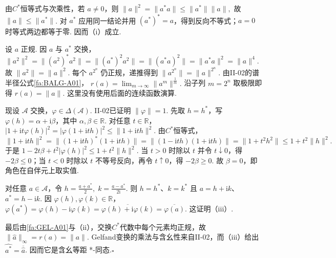 \begin{FAProof}
由\(\displaystyle C^*\)恒等式与次乘性，若 \(\displaystyle a\neq0\)，则
\(\displaystyle \|a\|^2=\|a^*a\|\leqslant\|a^*\|\|a\|,\)
故 \(\displaystyle\|a\|\leqslant\|a^*\|\). 对 \(\displaystyle a^*\) 应用同一结论并用 \(\displaystyle(a^*)^*=a\)，得到反向不等式；\(\displaystyle a=0\) 时等式两边都等于零. 因而（i）成立.

设 \(\displaystyle a\) 正规. 因 \(\displaystyle a\) 与 \(\displaystyle a^*\) 交换，
\(\displaystyle \|a^2\|^2=\|(a^2)^*a^2\|=\|(a^*)^2a^2\|=\|(a^*a)^2\|=\|a^*a\|^2=\|a\|^4.\)
故 \(\displaystyle\|a^2\|=\|a\|^2\). 每个 \(\displaystyle a^{2^n}\) 仍正规，递推得到
\(\displaystyle \|a^{2^n}\|=\|a\|^{2^n}.\)
由II-02的谱半径公式\autoref{fa:BALG-A01}，
\(\displaystyle r(a)=\lim_{m\to\infty}\|a^m\|^{\frac{1}{m}}.\)
沿子列 \(\displaystyle m=2^n\) 取极限即得 \(\displaystyle r(a)=\|a\|\). 这里没有使用后面的连续函数演算.

现设 \(\displaystyle\mathcal A\) 交换，\(\displaystyle\varphi\in\Delta(\mathcal A)\). II-02已证明 \(\displaystyle\|\varphi\|=1\). 先取 \(\displaystyle h=h^*\)，写 \(\displaystyle\varphi(h)=\alpha+\mathrm{i}\beta\)，其中 \(\displaystyle\alpha,\beta\in\mathbb R\). 对任意 \(\displaystyle t\in\mathbb R\)，
\(\displaystyle |1+\mathrm{i}t\varphi(h)|^2 =|\varphi(1+\mathrm{i}th)|^2 \leqslant\|1+\mathrm{i}th\|^2.\)
由\(\displaystyle C^*\)恒等式，
\[
\|1+\mathrm{i}th\|^2=\|(1+\mathrm{i}th)^*(1+\mathrm{i}th)\|=\|(1-\mathrm{i}th)(1+\mathrm{i}th)\|=\|1+t^2h^2\|\leqslant1+t^2\|h\|^2.
\]
于是
\(\displaystyle 1-2t\beta+t^2|\varphi(h)|^2 \leqslant 1+t^2\|h\|^2.\)
当 \(\displaystyle t>0\) 时除以 \(\displaystyle t\) 并令 \(\displaystyle t\downarrow0\)，得 \(\displaystyle-2\beta\leqslant0\)；当 \(\displaystyle t<0\) 时除以 \(\displaystyle t\) 不等号反向，再令 \(\displaystyle t\uparrow0\)，得 \(\displaystyle-2\beta\geqslant0\). 故 \(\displaystyle\beta=0\)，即角色在自伴元上取实值.

对任意 \(\displaystyle a\in\mathcal A\)，令
\(\displaystyle h=\frac{a+a^*}{2}, \; k=\frac{a-a^*}{2\mathrm{i}}.\)
则 \(\displaystyle h=h^*\)、\(\displaystyle k=k^*\) 且 \(\displaystyle a=h+\mathrm{i}k\)、\(\displaystyle a^*=h-\mathrm{i}k\). 因 \(\displaystyle\varphi(h),\varphi(k)\in\mathbb R\)，
\(\displaystyle \varphi(a^*) =\varphi(h)-\mathrm{i}\varphi(k) =\overline{\varphi(h)+\mathrm{i}\varphi(k)} =\overline{\varphi(a)}.\)
这证明（iii）.

最后由\autoref{fa:GEL-A01}与（ii），交换\(\displaystyle C^*\)代数中每个元素均正规，故
\(\displaystyle \|\widehat a\|_\infty=r(a)=\|a\|.\)
Gelfand变换的乘法与含幺性来自II-02，而（iii）给出 \(\displaystyle\widehat{a^*}=\overline{\widehat a}\). 因而它是含幺等距 *-同态.\hfill\(\square\)
\end{FAProof}

